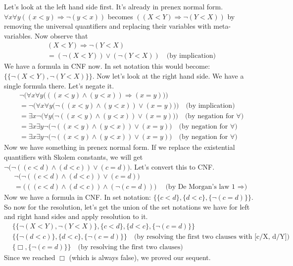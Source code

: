 \documentclass[10pt]{article}
\newenvironment{solution}[1][\emph{Solution:}]{\begin{trivlist}
\item[\hskip \labelsep {\bfseries #1}]}{\end{trivlist}}
\newcommand{\imp}{\ensuremath{\Rightarrow}}
\newcommand{\set}[1]{\{#1\}}
\begin{document}
\begin{solution}
Let's look at the left hand side first. It's already in prenex normal form.
$\forall x \forall y ((x < y) \imp \lnot (y < x))$ becomes $((X < Y) \imp \lnot (Y < X))$ by removing the universal quantifiers and replacing their variables with meta-variables. Now observe that
\begin{align*}
& (X < Y) \imp \lnot (Y < X)\\
&= (\lnot (X < Y)) \lor (\lnot (Y < X))  \quad\text{(by implication)}
\end{align*}
We have a formula in CNF now. In set notation this would become: $\set{\set{\lnot (X < Y), \lnot (Y < X)}}$.
Now let's look at the right hand side.
We have a single formula there. Let's negate it.
\begin{align*}
& \lnot \Big(\forall x \forall y \big(((x<y) \land (y < x)) \imp (x = y)\big)\Big)\\
&= \lnot \Big(\forall x \forall y \big(\lnot ((x<y) \land (y < x)) \lor (x = y)\big)\Big) \quad\text{(by implication)}\\
&= \exists x \lnot \Big( \forall y \big(\lnot ((x<y) \land (y < x)) \lor (x = y)\big)\Big) \quad\text{(by negation for $\forall$)}\\
&= \exists x \exists y \lnot \big(\lnot ((x<y) \land (y < x)) \lor (x = y)\big) \quad\text{(by negation for $\forall$)}\\
&= \exists x \exists y \lnot \big(\lnot ((x<y) \land (y < x)) \lor (x = y)\big) \quad\text{(by negation for $\forall$)}
\end{align*}
Now we have something in prenex normal form. If we replace the existential quantifiers with Skolem constants, we will get $\lnot \big(\lnot ((c<d) \land (d < c)) \lor (c = d)\big)$. Let's convert this to CNF.
\begin{align*}
& \lnot \big(\lnot ((c<d) \land (d < c)) \lor (c = d)\big)\\
&= \big(((c<d) \land (d < c)) \land (\lnot(c = d))\big) \quad\text{(by De Morgan's law 1 $\imp$)}
\end{align*}
Now we have a formula in CNF. In set notation: $\set{\set{c<d}, \set{d<c}, \set{\lnot (c=d)}}$.
So now for the resolution, let's get the union of the set notations we have for left and right hand sides and apply resolution to it.
\begin{align*}
& \set{\set{\lnot (X < Y), \lnot (Y < X)}, \set{c<d}, \set{d<c}, \set{\lnot (c=d)}}\\
& \set{\set{\lnot (d < c)}, \set{d<c}, \set{\lnot (c=d)}} \quad\text{(by resolving the first two clauses with [c/X, d/Y])}\\
& \set{\Box, \set{\lnot (c=d)}} \quad\text{(by resolving the first two clauses)}
\end{align*}
Since we reached $\Box$ (which is always false), we proved our sequent.
\end{solution}
\end{document}
